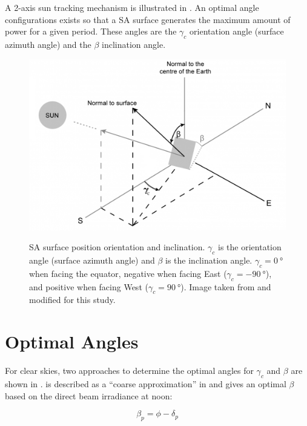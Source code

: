 A 2-axis sun tracking mechanism is illustrated in . An optimal angle configurations exists so that a \ac{SA} surface generates the maximum amount of power for a given period. These angles are the $\gamma_{c}$ orientation angle (surface azimuth angle) and the $\beta$ inclination angle.

\begin{figure}[h]
  \centering
  \hypersetup{linkcolor=captionTextColor}
  \includegraphics[width=0.7\linewidth]{sections/appendix/optimal-angles/images/beta-and-gamma-angles-on-tilted-surface.png}\\
  \caption[Solar array surface position orientation and inclination]
          {\ac{SA} surface position orientation and inclination. $\gamma_{c}$ is the orientation angle (surface azimuth angle) and $\beta$ is the inclination angle. $\gamma_{c} = \SI{0}{\degree}$ when facing the equator, negative when facing East ($\gamma_{c} = \SI{-90}{\degree}$), and positive when facing West ($\gamma_{c} = \SI{+90}{\degree}$). Image taken from  and modified for this study.}
  \label{fig:tilted-surface-sun-tracking}
\end{figure}

\section{Optimal Angles}
For clear skies, two approaches to determine the optimal angles for $\gamma_{c}$ and $\beta$ are shown in .  is described as a ``coarse approximation'' in  and gives an optimal $\beta$ based on the direct beam irradiance at noon:

\begin{equation}
  \label{eq:optimal_beta_irradiance}
  \beta_{p} = \phi - \delta_{p}
\end{equation}

